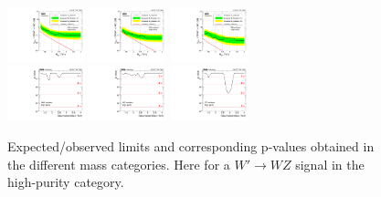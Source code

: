 \begin{figure}[h!]
\centering
\includegraphics[width=0.20\textwidth]{figures/analysis/search1/AN-15-211/limits/brazilianFlag_WZ_WWHP_13TeV_wPDF.pdf}
\includegraphics[width=0.20\textwidth]{figures/analysis/search1/AN-15-211/limits/brazilianFlag_WZ_WZHP_13TeV_wPDF.pdf}
\includegraphics[width=0.20\textwidth]{figures/analysis/search1/AN-15-211/limits/brazilianFlag_WZ_ZZHP_13TeV_wPDF.pdf}\\
\includegraphics[width=0.20\textwidth]{figures/analysis/search1/AN-15-211/pvalues/pvalue_WZinWW_high_purity.pdf}
\includegraphics[width=0.20\textwidth]{figures/analysis/search1/AN-15-211/pvalues/pvalue_WZinWZ_high_purity.pdf}
\includegraphics[width=0.20\textwidth]{figures/analysis/search1/AN-15-211/pvalues/pvalue_WZinZZ_high_purity.pdf}
\caption{Expected/observed limits and corresponding p-values obtained in the different mass categories. Here for a $W'\rightarrow WZ$ signal in the high-purity category.}
\label{fig:app:Limits_HPWZ}
\end{figure}

